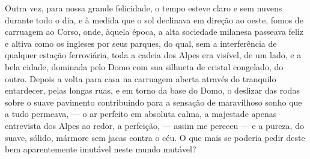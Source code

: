 Outra vez, para nossa grande felicidade, o tempo esteve claro e sem
nuvens durante todo o dia, e à medida que o sol declinava em direção ao
oeste, fomos de carruagem ao Corso, onde, àquela época, a alta sociedade
milanesa passeava feliz e altiva como os ingleses por seus parques, do
qual, sem a interferência de qualquer estação ferroviária, toda a cadeia
dos Alpes era visível, de um lado, e a bela cidade, dominada pelo Domo
com sua silhueta de cristal congelado, do outro. Depois a volta para
casa na carruagem aberta através do tranquilo entardecer, pelas longas
ruas, e em torno da base do Domo, o deslizar das rodas sobre o suave
pavimento contribuindo para a sensação de maravilhoso sonho que a tudo
permeava, --- o ar perfeito em absoluta calma, a majestade apenas
entrevista dos Alpes ao redor, a perfeição, --- assim me pereceu --- e a
pureza, do suave, sólido, mármore sem jacas contra o céu. O que mais se
poderia pedir deste bem aparentemente imutável neste mundo mutável?

